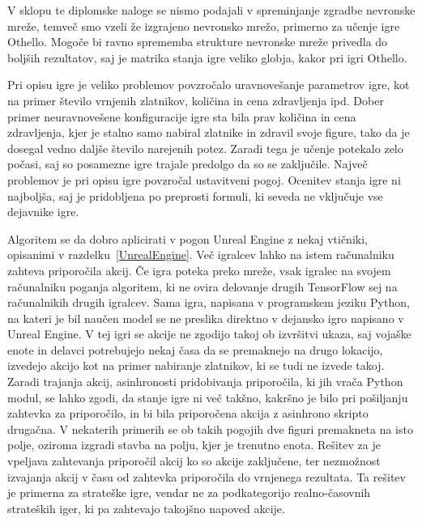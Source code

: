 \documentclass[a4paper, 12pt]{book}
\begin{document}
V sklopu te diplomske naloge se nismo podajali v spreminjanje zgradbe nevronske mreže, temveč smo vzeli že izgrajeno nevronsko mrežo, primerno za učenje igre Othello.
Mogoče bi ravno sprememba strukture nevronske mreže privedla do boljših rezultatov, saj je matrika stanja igre veliko globja, kakor pri igri Othello.

Pri opisu igre je veliko problemov povzročalo uravnovešanje parametrov igre, kot na primer število vrnjenih zlatnikov, količina in cena zdravljenja ipd.
Dober primer neuravnovešene konfiguracije igre sta bila prav količina in cena zdravljenja, kjer je stalno samo nabiral zlatnike in zdravil svoje figure, tako da je dosegal vedno daljše število narejenih potez.
Zaradi tega je učenje potekalo zelo počasi, saj so posamezne igre trajale predolgo da so se zaključile.
Največ problemov je pri opisu igre povzročal ustavitveni pogoj.
Ocenitev stanja igre ni najboljša, saj je pridobljena po preprosti formuli, ki seveda ne vključuje vse dejavnike igre.



Algoritem se da dobro aplicirati v pogon Unreal Engine z nekaj vtičniki, opisanimi v razdelku~\ref{UnrealEngine}. Več igralcev lahko na istem računalniku zahteva priporočila akcij. 
Če igra poteka preko mreže, vsak igralec na svojem računalniku poganja algoritem, ki ne ovira delovanje drugih TensorFlow sej na računalnikih drugih igralcev.
Sama igra, napisana v programskem jeziku Python, na kateri je bil naučen model se ne preslika direktno v dejansko igro napisano v Unreal Engine.
V tej igri se akcije ne zgodijo takoj ob izvršitvi ukaza, saj vojaške enote in delavci potrebujejo nekaj časa da se premaknejo na drugo lokacijo, izvedejo akcijo kot na primer nabiranje zlatnikov, ki se tudi ne izvede takoj.
Zaradi trajanja akcij, asinhronosti pridobivanja priporočila, ki jih vrača Python modul, se lahko zgodi, da stanje igre ni več takšno, kakršno je bilo pri pošiljanju zahtevka za priporočilo, in bi bila priporočena akcija z asinhrono skripto drugačna. 
V nekaterih primerih se ob takih pogojih dve figuri premakneta na isto polje, oziroma izgradi stavba na polju, kjer je trenutno enota. 
Rešitev za je vpeljava zahtevanja priporočil akcij ko so akcije zaključene, ter nezmožnost izvajanja akcij v času od zahtevka priporočila do vrnjenega rezultata.
Ta rešitev je primerna za strateške igre, vendar ne za podkategorijo realno-časovnih strateških iger, ki pa zahtevajo takojšno napoved akcije.
\end{document}
